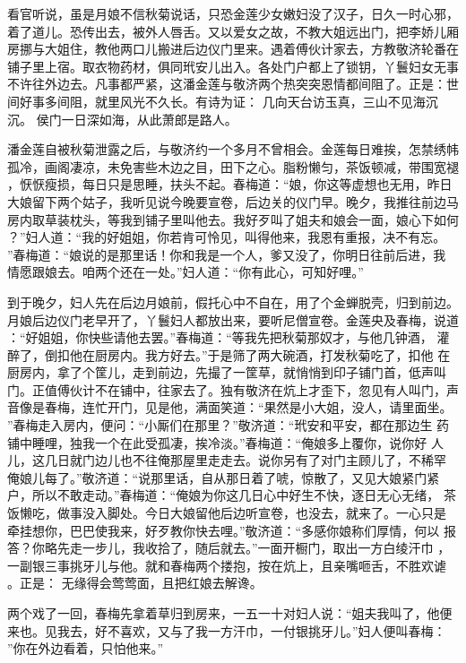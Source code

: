 看官听说，虽是月娘不信秋菊说话，只恐金莲少女嫩妇没了汉子，日久一时心邪，
着了道儿。恐传出去，被外人唇舌。又以爱女之故，不教大姐远出门，把李娇儿厢
房挪与大姐住，教他两口儿搬进后边仪门里来。遇着傅伙计家去，方教敬济轮番在
铺子里上宿。取衣物药材，俱同玳安儿出入。各处门户都上了锁钥，丫鬟妇女无事
不许往外边去。凡事都严紧，这潘金莲与敬济两个热突突恩情都间阻了。正是：世
间好事多间阻，就里风光不久长。有诗为证：
几向天台访玉真，三山不见海沉沉。
侯门一日深如海，从此萧郎是路人。

潘金莲自被秋菊泄露之后，与敬济约一个多月不曾相会。金莲每日难挨，怎禁绣帏
孤冷，画阁凄凉，未免害些木边之目，田下之心。脂粉懒匀，茶饭顿减，带围宽褪
，恹恹瘦损，每日只是思睡，扶头不起。春梅道：“娘，你这等虚想也无用，昨日
大娘留下两个姑子，我听见说今晚要宣卷，后边关的仪门早。晚夕，我推往前边马
房内取草装枕头，等我到铺子里叫他去。我好歹叫了姐夫和娘会一面，娘心下如何
？”妇人道：“我的好姐姐，你若肯可怜见，叫得他来，我恩有重报，决不有忘。
”春梅道：“娘说的是那里话！你和我是一个人，爹又没了，你明日往前后进，我
情愿跟娘去。咱两个还在一处。”妇人道：“你有此心，可知好哩。”

到于晚夕，妇人先在后边月娘前，假托心中不自在，用了个金蝉脱壳，归到前边。
月娘后边仪门老早开了，丫鬟妇人都放出来，要听尼僧宣卷。金莲央及春梅，说道
：“好姐姐，你快些请他去罢。”春梅道：“等我先把秋菊那奴才，与他几钟酒，
灌醉了，倒扣他在厨房内。我方好去。”于是筛了两大碗酒，打发秋菊吃了，扣他
在厨房内，拿了个筐儿，走到前边，先撮了一筐草，就悄悄到印子铺门首，低声叫
门。正值傅伙计不在铺中，往家去了。独有敬济在炕上才歪下，忽见有人叫门，声
音像是春梅，连忙开门，见是他，满面笑道：“果然是小大姐，没人，请里面坐。
”春梅走入房内，便问：“小厮们在那里？”敬济道：“玳安和平安，都在那边生
药铺中睡哩，独我一个在此受孤凄，挨冷淡。”春梅道：“俺娘多上覆你，说你好
人儿，这几日就门边儿也不往俺那屋里走走去。说你另有了对门主顾儿了，不稀罕
俺娘儿每了。”敬济道：“说那里话，自从那日着了唬，惊散了，又见大娘紧门紧
户，所以不敢走动。”春梅道：“俺娘为你这几日心中好生不快，逐日无心无绪，
茶饭懒吃，做事没入脚处。今日大娘留他后边听宣卷，也没去，就来了。一心只是
牵挂想你，巴巴使我来，好歹教你快去哩。”敬济道：“多感你娘称们厚情，何以
报答？你略先走一步儿，我收拾了，随后就去。”一面开橱门，取出一方白绫汗巾
，一副银三事挑牙儿与他。就和春梅两个搂抱，按在炕上，且亲嘴咂舌，不胜欢谑
。正是：
无缘得会莺莺面，且把红娘去解谗。

两个戏了一回，春梅先拿着草归到房来，一五一十对妇人说：“姐夫我叫了，他便
来也。见我去，好不喜欢，又与了我一方汗巾，一付银挑牙儿。”妇人便叫春梅：
”你在外边看着，只怕他来。”

